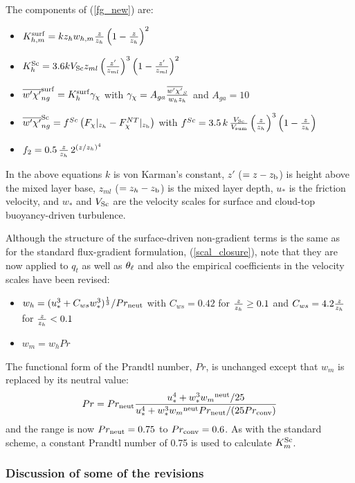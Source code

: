 \documentclass{UMDP_article}
\begin{document}
The components of (\ref{fg_new}) are:
\begin{itemize}
\item{$K_{h,m}^{\rm surf} = k z_h w_{h,m} \frac{z}{z_h} \left( 1-\frac{z}{z_h} \right)^2$}
\item{$K_h^{\rm Sc} = 3.6 k V_{\rm Sc} z_{ml} \left( \frac{z'}{z_{ml}} \right)^{3}\left( 1-\frac{z'}{z_{ml}}
    \right)^{2}$}
\item{$\overline{w'\chi'}_{ng}^{\rm surf}=K_h^{\rm surf} \gamma_{\chi}$ with
    $\gamma_{\chi}=A_{ga}\frac{\overline{w'\chi'}_S}{w_h z_h}$ and $A_{ga}=10$}
\item{$\overline{w'\chi'}_{ng}^{\rm Sc} = f^{Sc} \left( F_{\chi}|_{z_h}- F_{\chi}^{NT}|_{z_{\rm b}}
    \right) $ with $f^{Sc}=3.5 \, k \, \frac{V_{\rm Sc}}{V_{\rm sum}}
    \left(\frac{z}{z_h}\right)^{3}\left(1-\frac{z}{z_h} \right)$}
\item{$f_2 = 0.5 \, \frac{z}{z_h} \, 2^{(z/z_h)^4}$}
\end{itemize}
In the above equations $k$ is von Karman's constant, $z'$
($=z-z_{\rm b}$) is height above the mixed layer base, $z_{ml}$
($=z_h-z_{\rm b}$) is the mixed layer depth, $u_*$ is the friction
velocity, and $w_*$ and $V_{\rm Sc}$ are the velocity scales for surface
and cloud-top buoyancy-driven turbulence.

Although the structure of the surface-driven non-gradient terms is the
same as for the standard flux-gradient formulation,
(\ref{scal_closure}), note that they are now applied to $q_t$ as well
as $\theta_{\ell}$ and also the empirical coefficients in the velocity
scales have been revised:
\begin{itemize}
\item{$w_h = (u_*^3 + C_{ws} w_*^3)^{\frac{1}{3}} / Pr_{\rm neut} $ with
    $C_{ws}=0.42$ for $\frac{z}{z_h} \geq 0.1$ and $C_{ws}=4.2 \frac{z}{z_h}$ for
    $\frac{z}{z_h}<0.1$ }
\item{$w_m = w_h Pr $}
\end{itemize}
The functional form of the Prandtl number, $Pr$, is unchanged except
that $w_m$ is replaced by its neutral value:
\begin{equation*}
  Pr =  Pr_{\rm neut} 
  \frac{u_*^4 + w_*^3 {w_m}^{\rm neut} / 25}
  {u_*^4 + w_*^3 {w_m}^{\rm neut} Pr_{\rm neut}/ (25 Pr_{\rm conv} )}
\end{equation*}
and the range is now $ Pr_{\rm neut} = 0.75$ to $ Pr_{\rm conv} =
0.6$.  As with the standard scheme, a constant Prandtl number of 0.75
is used to calculate $K_m^{\rm Sc}$.

\subsubsection{Discussion of some of the revisions}
\end{document}
